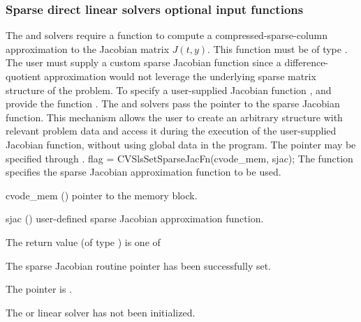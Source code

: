 \subsubsection{Sparse direct linear solvers optional input functions}
\label{sss:optin_sls}
The 
{\cvklu} and {\cvsuperlumt} solvers require a function to compute a
compressed-sparse-column approximation to the Jacobian matrix
$J(t,y)$.  This function must be of type .  
The user must supply a custom sparse Jacobian function since a
difference-quotient approximation would not leverage the underlying
sparse matrix structure of the problem.  To specify a user-supplied
Jacobian function , {\cvklu} and {\cvsuperlumt} provide the
function .  The {\cvklu} and {\cvsuperlumt}
solvers pass the pointer  to the sparse Jacobian
function. This mechanism allows the user to create an arbitrary structure with
relevant problem data and access it during the execution of the
user-supplied Jacobian function, without using global data in the program.  
The pointer  may be specified through .
{
  flag = CVSlsSetSparseJacFn(cvode\_mem, sjac);
}
{
  The function  specifies the sparse Jacobian
  approximation function to be used.
}
{
  \begin{args}
  \item[cvode\_mem] ()
    pointer to the {\cvodes} memory block.
  \item[sjac] ()
    user-defined sparse Jacobian approximation function.
  \end{args}
}
{
  The return value  (of type ) is one of
  \begin{args}
  \item[\Id{CVSLS\_SUCCESS}] 
    The sparse Jacobian routine pointer has been successfully set.
  \item[\Id{CVSLS\_MEM\_NULL}]
    The  pointer is .
  \item[\Id{CVSLS\_LMEM\_NULL}]
    The {\cvklu} or {\cvsuperlumt} linear solver has not been initialized.
  \end{args}
}
